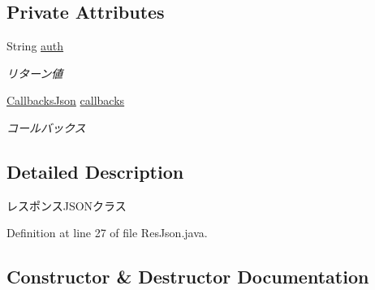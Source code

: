 \subsection*{Private Attributes}
\begin{DoxyCompactItemize}
\item 
\mbox{\label{classjp_1_1gr_1_1java__conf_1_1yuta__yoshinaga_1_1reversi_1_1model_1_1_res_json_a025a6255e8c44b7a6c1e1503e1195e84}} 
String \mbox{\hyperlink{classjp_1_1gr_1_1java__conf_1_1yuta__yoshinaga_1_1reversi_1_1model_1_1_res_json_a025a6255e8c44b7a6c1e1503e1195e84}{auth}}
\begin{DoxyCompactList}\small\item\em リターン値 \end{DoxyCompactList}\item 
\mbox{\label{classjp_1_1gr_1_1java__conf_1_1yuta__yoshinaga_1_1reversi_1_1model_1_1_res_json_a39c4406106b7bfae1aeb9c56f4a51f46}} 
\mbox{\hyperlink{classjp_1_1gr_1_1java__conf_1_1yuta__yoshinaga_1_1reversi_1_1model_1_1_callbacks_json}{Callbacks\+Json}} \mbox{\hyperlink{classjp_1_1gr_1_1java__conf_1_1yuta__yoshinaga_1_1reversi_1_1model_1_1_res_json_a39c4406106b7bfae1aeb9c56f4a51f46}{callbacks}}
\begin{DoxyCompactList}\small\item\em コールバックス \end{DoxyCompactList}\end{DoxyCompactItemize}


\subsection{Detailed Description}
レスポンス\+J\+S\+O\+Nクラス 

Definition at line 27 of file Res\+Json.\+java.



\subsection{Constructor \& Destructor Documentation}
\mbox{\label{classjp_1_1gr_1_1java__conf_1_1yuta__yoshinaga_1_1reversi_1_1model_1_1_res_json_ac67902ff0ff40d4b25e3ded78b5098a2}} 

